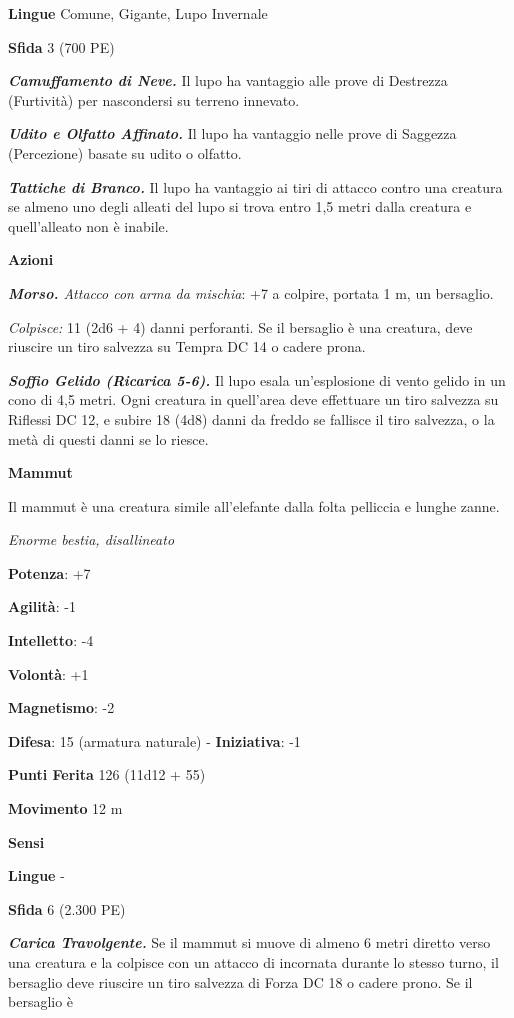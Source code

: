 \begin{multicols}{2}
\textbf{Lingue} Comune, Gigante, Lupo Invernale

\textbf{Sfida} 3 (700 PE)\smallskip

\emph{\textbf{Camuffamento di Neve.}} Il lupo ha vantaggio alle prove di
Destrezza (Furtività) per nascondersi su terreno innevato.

\emph{\textbf{Udito e Olfatto Affinato.}} Il lupo ha vantaggio nelle
prove di Saggezza (Percezione) basate su udito o olfatto.

\emph{\textbf{Tattiche di Branco.}} Il lupo ha vantaggio ai tiri di
attacco contro una creatura se almeno uno degli alleati del lupo si
trova entro 1,5 metri dalla creatura e quell'alleato non è inabile.

\smallskip\textbf{Azioni}

\emph{\textbf{Morso.} Attacco con arma da mischia}: +7 a colpire,
portata 1 m, un bersaglio.

\emph{Colpisce:} 11 (2d6 + 4) danni perforanti. Se il bersaglio è una
creatura, deve riuscire un tiro salvezza su Tempra DC 14 o cadere prona.

\emph{\textbf{Soffio Gelido (Ricarica 5-6).}} Il lupo esala
un'esplosione di vento gelido in un cono di 4,5 metri. Ogni creatura in
quell'area deve effettuare un tiro salvezza su Riflessi DC 12, e subire
18 (4d8) danni da freddo se fallisce il tiro salvezza, o la metà di
questi danni se lo riesce.

\textbf{Mammut}

Il mammut è una creatura simile all'elefante dalla folta pelliccia e
lunghe zanne.

\emph{Enorme bestia, disallineato}

\textbf{Potenza}: +7

\textbf{Agilità}: -1

\textbf{Intelletto}: -4

\textbf{Volontà}: +1

\textbf{Magnetismo}: -2

\textbf{Difesa}: 15 (armatura naturale) - \textbf{Iniziativa}: -1

\textbf{Punti Ferita} 126 (11d12 + 55)

\textbf{Movimento} 12 m

\textbf{Sensi} 

\textbf{Lingue} -

\textbf{Sfida} 6 (2.300 PE)\smallskip

\emph{\textbf{Carica Travolgente.}} Se il mammut si muove di almeno 6
metri diretto verso una creatura e la colpisce con un attacco di
incornata durante lo stesso turno, il bersaglio deve riuscire un tiro
salvezza di Forza DC 18 o cadere prono. Se il bersaglio è




\end{multicols}
